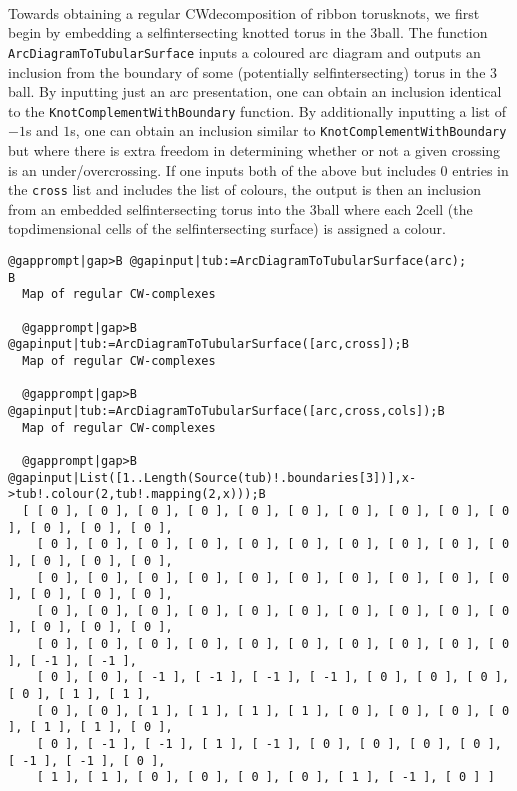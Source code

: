 \documentclass[a4paper,11pt]{report}
\begin{document}
{{\begin{Verbatim}[commandchars=!|B,fontsize=\small,frame=single,label=Example]
  
\end{Verbatim}
 

  

 Towards obtaining a regular CW\texttt{}decomposition of ribbon
torus\texttt{}knots, we first begin by embedding a
self\texttt{}intersecting knotted torus in the
3\texttt{}ball. The function \texttt{ArcDiagramToTubularSurface} inputs a coloured arc diagram and outputs an inclusion from the boundary of
some (potentially self\texttt{}intersecting) torus in the $3$\texttt{}ball. By inputting just an arc presentation, one can
obtain an inclusion identical to the \texttt{KnotComplementWithBoundary} function. By additionally inputting a list of $-1$s and $1$s, one can obtain an inclusion similar to \texttt{KnotComplementWithBoundary} but where there is extra freedom in determining whether or not a given
crossing is an under/overcrossing. If one inputs both of the above but
includes $0$ entries in the \texttt{cross} list and includes the list of colours, the output is then an inclusion from an
embedded self\texttt{}intersecting torus into the
3\texttt{}ball where each $2$\texttt{}cell (the top\texttt{}dimensional cells of the
self\texttt{}intersecting surface) is assigned a colour. 
\begin{Verbatim}[commandchars=@|B,fontsize=\small,frame=single,label=Example]
  @gapprompt|gap>B @gapinput|tub:=ArcDiagramToTubularSurface(arc);        B
  Map of regular CW-complexes
  
  @gapprompt|gap>B @gapinput|tub:=ArcDiagramToTubularSurface([arc,cross]);B
  Map of regular CW-complexes
  
  @gapprompt|gap>B @gapinput|tub:=ArcDiagramToTubularSurface([arc,cross,cols]);B
  Map of regular CW-complexes
  
  @gapprompt|gap>B @gapinput|List([1..Length(Source(tub)!.boundaries[3])],x->tub!.colour(2,tub!.mapping(2,x)));B
  [ [ 0 ], [ 0 ], [ 0 ], [ 0 ], [ 0 ], [ 0 ], [ 0 ], [ 0 ], [ 0 ], [ 0 ], [ 0 ], [ 0 ], [ 0 ], 
    [ 0 ], [ 0 ], [ 0 ], [ 0 ], [ 0 ], [ 0 ], [ 0 ], [ 0 ], [ 0 ], [ 0 ], [ 0 ], [ 0 ], [ 0 ], 
    [ 0 ], [ 0 ], [ 0 ], [ 0 ], [ 0 ], [ 0 ], [ 0 ], [ 0 ], [ 0 ], [ 0 ], [ 0 ], [ 0 ], [ 0 ], 
    [ 0 ], [ 0 ], [ 0 ], [ 0 ], [ 0 ], [ 0 ], [ 0 ], [ 0 ], [ 0 ], [ 0 ], [ 0 ], [ 0 ], [ 0 ], 
    [ 0 ], [ 0 ], [ 0 ], [ 0 ], [ 0 ], [ 0 ], [ 0 ], [ 0 ], [ 0 ], [ 0 ], [ -1 ], [ -1 ], 
    [ 0 ], [ 0 ], [ -1 ], [ -1 ], [ -1 ], [ -1 ], [ 0 ], [ 0 ], [ 0 ], [ 0 ], [ 1 ], [ 1 ], 
    [ 0 ], [ 0 ], [ 1 ], [ 1 ], [ 1 ], [ 1 ], [ 0 ], [ 0 ], [ 0 ], [ 0 ], [ 1 ], [ 1 ], [ 0 ], 
    [ 0 ], [ -1 ], [ -1 ], [ 1 ], [ -1 ], [ 0 ], [ 0 ], [ 0 ], [ 0 ], [ -1 ], [ -1 ], [ 0 ], 
    [ 1 ], [ 1 ], [ 0 ], [ 0 ], [ 0 ], [ 0 ], [ 1 ], [ -1 ], [ 0 ] ]
  

\end{Verbatim}}}
\end{document}

